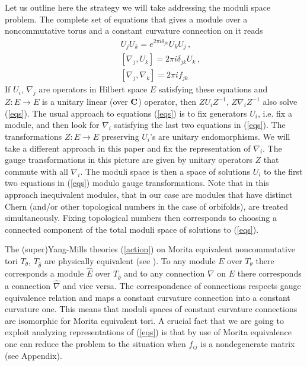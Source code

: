 \documentclass[a4paper,a4paper]{article}
\begin{document}
Let us  outline here the strategy we  will take addressing the moduli space problem. 
The complete set of equations that gives  a module over  a noncommutative torus  and a constant curvature 
connection on it reads 
\begin{eqnarray} \label{eqs}
&&U_{j}U_{k} = e^{2\pi i \theta_{jk}} U_{k}U_{j} \, , \nonumber \\
&&[\nabla_{j}, U_{k} ] = 2\pi i \delta_{jk} U_{k} \, , \nonumber \\
&&  [\nabla_{j}, \nabla_{k}]=2\pi i f_{jk} 
\end{eqnarray}   
If $U_{i}$, $\nabla_{j}$ are operators in Hilbert space $E$ satisfying these equations and 
 $Z: E\to E$ is a unitary linear (over $\bf C$) operator, then $ZU_{i}Z^{-1}$, $Z\nabla_{i}Z^{-1}$ also solve (\ref{eqs}). 
The usual approach to equations  (\ref{eqs}) is to fix generators $U_{i}$, i.e. fix a module, and then look for $\nabla_{i}$ 
satisfying the last two equations in (\ref{eqs}). 
The transformations $Z: E\to E$ preserving $U_{i}$'s are unitary endomorphisms.
We will take a different approach in this paper and fix the representation of $\nabla_{i}$. The gauge transformations in this 
picture are given by unitary operators $Z$ that commute with all $\nabla_{i}$. The moduli space is then a space of 
solutions $U_{i}$ to the first two equations in (\ref{eqs}) modulo gauge transformations. 
Note that in this approach  inequivalent  modules, that in our case are  modules that have distinct Chern (and/or other topological 
numbers in the case of orbifolds),   are treated simultaneously. 
Fixing topological numbers then corresponds to choosing a connected component of the total moduli space of solutions to (\ref{eqs}).


The (super)Yang-Mills theories (\ref{action}) on Morita equivalent noncommutative tori $T_{\theta}$, $T_{\hat \theta}$ 
are physically equivalent (see \cite{ASMorita}).
To any module $E$ over $T_{\theta}$ there corresponds a module $\hat E$ over $T_{\hat \theta}$ and to any connection 
$\nabla$ on $E$ there corresponds a connection $\hat \nabla$ and vice versa. The correspondence of connections 
respects gauge equivalence relation and maps a constant curvature connection into a constant curvature one. This 
means that moduli spaces of constant curvature connections are isomorphic for Morita equivalent tori.  
 A crucial fact that we are going to exploit analyzing representations of (\ref{eqs}) is that by use of Morita equivalence 
one can reduce the problem to the situation when $f_{ij}$ is a nondegenerate matrix (see Appendix). 
\end{document}

